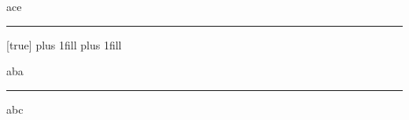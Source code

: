 \documentclass[10pt]{beamer}
\begin{document}
\begin{frame}[c]{} %
\null\vfill\null
ace\rule[.5ex]{.5\textwidth}{.5pt}
\vfill
\end{frame}

\makeatletter
{}[true]{%
  \beamer@frametopskip=0pt plus 1fill\relax%
  \beamer@framebottomskip=0pt plus 1fill\relax%
}
\makeatother
\begin{frame}[c]
aba\rule[.5ex]{.5\textwidth}{.5pt}abc
\end{frame}
\end{document}
